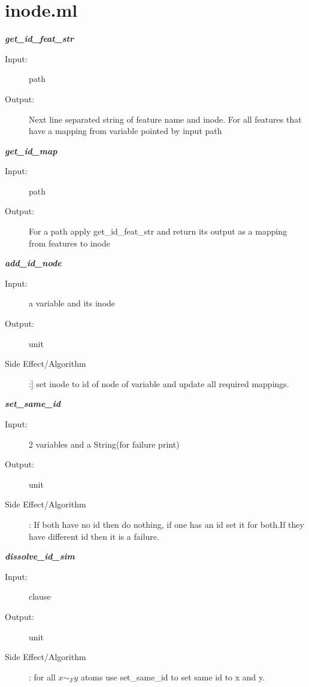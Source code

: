 \documentclass[12pt]{article}
\begin{document}
\section{inode.ml}
\begin{description}

\item \textbf{\textit{get\_id\_feat\_str}}
\begin{description}
    \item[Input:] path
    \item[Output:] Next line separated string of feature name and inode. For all features that have a mapping from variable pointed by input path
\end{description}

\item \textbf{\textit{get\_id\_map}}
\begin{description}
    \item[Input:] path
    \item[Output:] For a path apply get\_id\_feat\_str and return its output as a mapping from features to inode
\end{description}

\item \textbf{\textit{add\_id\_node}}
\begin{description}
    \item[Input:] a variable and its inode
    \item[Output:] unit
    \item[Side Effect/Algorithm]:] set inode to id of node of variable and update all required mappings.
\end{description}

\item \textbf{\textit{set\_same\_id}}
\begin{description}
    \item[Input:] 2 variables and a String(for failure print)
    \item[Output:] unit
    \item[Side Effect/Algorithm]: If both have no id then do nothing, if one has an id set it for both.If they have different id then it is a failure.
\end{description}

\item \textbf{\textit{dissolve\_id\_sim}}
\begin{description}
    \item[Input:] clause
    \item[Output:] unit
    \item[Side Effect/Algorithm]: for all $x\sim_F y$ atoms use set\_same\_id to set same id to x and y.
\end{description}


\end{description}
\end{document}
